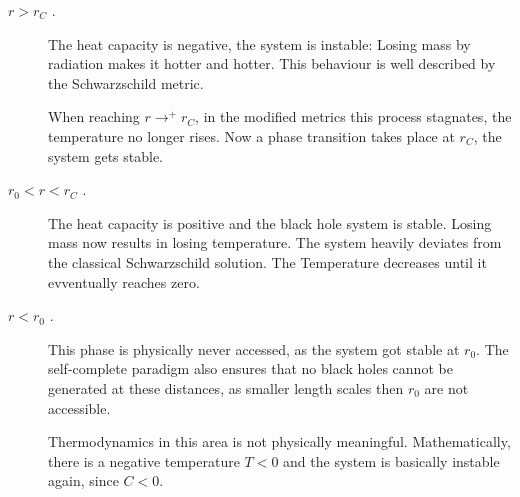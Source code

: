 \documentclass[12pt,a4paper]{report}
\numberwithin{equation}{chapter}
\begin{document}
\begin{description}
\item[$r > r_C$ .] The heat capacity is negative, the system is instable: Losing mass by radiation makes it hotter and hotter. This behaviour is well described by the Schwarzschild metric.

When reaching $r \to^+ r_C$, in the modified metrics this process stagnates, the temperature no longer rises. Now a phase transition takes place at $r_C$, the system gets stable.

\item[$r_0 < r < r_C$ .] The heat capacity is positive and the black hole system is stable. Losing mass now results in losing temperature. The system heavily deviates from the classical Schwarzschild solution. The Temperature decreases until it evventually reaches zero.

\item[$r < r_0$ .] This phase is physically never accessed, as the system got stable at $r_0$. The self-complete paradigm also ensures that no black holes cannot be generated at these distances, as smaller length scales then $r_0$ are not accessible.

Thermodynamics in this area is not physically meaningful. Mathematically, there is a negative temperature $T < 0$ and the system is basically instable again, since $C < 0$.
\end{description}
\end{document}
